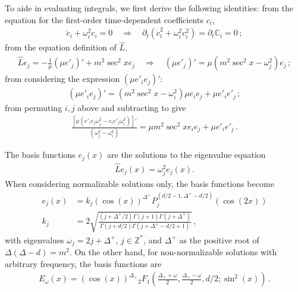 \documentclass[letterpaper,11pt]{article}
\newcommand{\p}{\partial}
\newcommand{\oi}{\omega_i}
\newcommand{\oj}{\omega_j}
\begin{document}
To aide in evaluating integrals, we first derive the following identities: from the equation for the first-order time-dependent coefficients $c_i$,
\begin{align} 
\ddot c_i + \oi^2 c_i = 0 \quad \Rightarrow \quad \p_t \left(\dot c_i^2 + \oi^2 c_i^2 \right) = \p_t \mathbb C_i = 0 \, ;
\end{align}
from the equation definition of $\hat L$,
\begin{align}
\hat L e_j = -\frac{1}{\mu} \left( \mu e'_j \right)' + m^2 \sec^2 x e_j \quad \Rightarrow \quad \left( \mu e'_j \right)' = \mu \left( m^2 \sec^2 x - \omega_j^2 \right) e_j \, ;
\end{align}
from considering the expression $\left( \mu e'_i e_j \right)'$:
\begin{align}
\left( \mu e'_i e_j \right) ' = \left(m^2 \sec^2 x - \oi^2 \right) \mu e_i e_j + \mu e'_i e'_j \, ;
\end{align}
from permuting $i, j$ above and subtracting to give
\begin{align}
\frac{\left[ \mu (e'_i e_j \oj^2 - e_i e'_j \oi^2 ) \right]'}{(\oj^2 - \oi^2)} = \mu m^2 \sec^2 x e_i e_j + \mu e'_i e'_j \, .
\end{align}

The basis functions $e_j (x)$ are the solutions to the eigenvalue equation
\begin{align}
\hat L e_j(x) = \omega^2_j e_j(x) .
\end{align}
When considering normalizable solutions only, the basis functions become
\begin{align}
e_j(x) &= k_j \left( \cos(x) \right)^{\Delta^+} P_{j}^{(d/2 - 1, \Delta^+ - d/2)} \left( \cos (2x) \right) \\
k_j &= 2 \sqrt{\frac{(j + \Delta^+ /2) \Gamma(j+1) \Gamma(j+\Delta^+)}{\Gamma(j+d/2) \Gamma(j + \Delta^+ - d/2 + 1)}} \, ,
\end{align} 
with eigenvalues $\omega_j = 2j + \Delta^+$, $j \in \mathbb{Z}^*$, and $\Delta^+$ as the positive root of $\Delta ( \Delta - d ) = m^2$. On the other hand, for non-normalizable solutions with arbitrary frequency, the basis functions are
\begin{align}
\label{general basis}
E_\omega (x) =  \left( \cos(x) \right)^{\Delta_+} {_2F_1} \left(\frac{\Delta_+ + \omega}{2}, \frac{\Delta_+ - \omega}{2}, d/2 ; \sin^2 (x) \right) \, .
\end{align}

\end{document}

